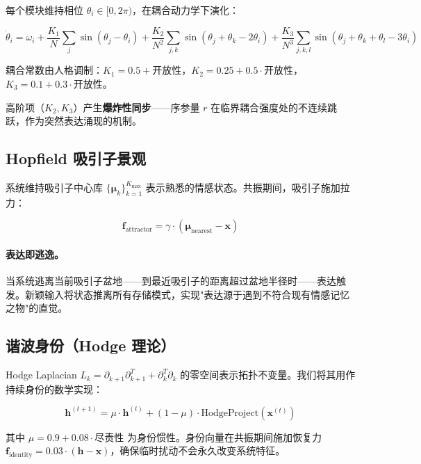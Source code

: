 \documentclass[UTF8,11pt]{ctexart}
\begin{document}
每个模块维持相位 $\theta_i \in [0, 2\pi)$，在耦合动力学下演化：

\begin{equation}
\dot{\theta}_i = \omega_i + \frac{K_1}{N}\sum_j \sin(\theta_j - \theta_i) + \frac{K_2}{N^2}\sum_{j,k} \sin(\theta_j + \theta_k - 2\theta_i) + \frac{K_3}{N^3}\sum_{j,k,l} \sin(\theta_j + \theta_k + \theta_l - 3\theta_i)
\end{equation}

耦合常数由人格调制：$K_1 = 0.5 + \text{开放性}$，$K_2 = 0.25 + 0.5 \cdot \text{开放性}$，$K_3 = 0.1 + 0.3 \cdot \text{开放性}$。

高阶项（$K_2, K_3$）产生\textbf{爆炸性同步}——序参量 $r$ 在临界耦合强度处的不连续跳跃，作为突然表达涌现的机制。

\subsection{Hopfield 吸引子景观}
\label{sec:hopfield}

系统维持吸引子中心库 $\{\boldsymbol{\mu}_k\}_{k=1}^{K_{\max}}$ 表示熟悉的情感状态。共振期间，吸引子施加拉力：

\begin{equation}
\mathbf{f}_{\text{attractor}} = \gamma \cdot (\boldsymbol{\mu}_{\text{nearest}} - \mathbf{x})
\end{equation}

\paragraph{表达即逃逸。}当系统逃离当前吸引子盆地——到最近吸引子的距离超过盆地半径时——表达触发。新颖输入将状态推离所有存储模式，实现"表达源于遇到不符合现有情感记忆之物"的直觉。

\subsection{谐波身份（Hodge 理论）}
\label{sec:identity}

Hodge Laplacian $L_k = \partial_{k+1}\partial_{k+1}^T + \partial_k^T\partial_k$ 的零空间表示拓扑不变量。我们将其用作持续身份的数学实现：

\begin{equation}
\mathbf{h}^{(t+1)} = \mu \cdot \mathbf{h}^{(t)} + (1-\mu) \cdot \text{HodgeProject}(\mathbf{x}^{(t)})
\end{equation}

其中 $\mu = 0.9 + 0.08 \cdot \text{尽责性}$ 为身份惯性。身份向量在共振期间施加恢复力 $\mathbf{f}_{\text{identity}} = 0.03 \cdot (\mathbf{h} - \mathbf{x})$，确保临时扰动不会永久改变系统特征。
\end{document}

